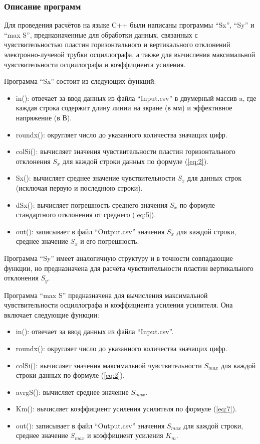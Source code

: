 \subsubsection{Описание программ}

Для проведения расчётов на языке C++ были написаны программы ``Sx'', ``Sy'' и ``max S'', предназначенные для обработки данных, связанных с чувствительностью пластин горизонтального и вертикального отклонений электронно-лучевой трубки осциллографа, а также для вычисления максимальной чувствительности осциллографа и коэффициента усиления.

Программа ``Sx'' состоит из следующих функций:
\begin{itemize}
\item in(): отвечает за ввод данных из файла ``Input.csv'' в двумерный массив a, где каждая строка содержит длину линии на экране (в мм) и эффективное напряжение (в В).
\item roundx(): округляет число до указанного количества значащих цифр.
\item colSi(): вычисляет значения чувствительности пластин горизонтального отклонения $S_x$ для каждой строки данных по формуле (\ref{eq:2}).
\item Sx(): вычисляет среднее значение чувствительности $S_x$ для данных строк (исключая первую и последнюю строки).
\item dSx(): вычисляет погрешность среднего значения $S_x$ по формуле стандартного отклонения от среднего (\ref{eq:5}).
\item out(): записывает в файл ``Output.csv'' значения $S_x$ для каждой строки, среднее значение $S_x$ и его погрешность.
\end{itemize}

Программа ``Sy'' имеет аналогичную структуру и в точности совпадающие функции, но предназначена для расчёта чувствительности пластин вертикального отклонения $S_y$.

Программа ``max S'' предназначена для вычисления максимальной чувствительности осциллографа и коэффициента усиления усилителя. Она включает следующие функции:

\begin{itemize}
\item in(): отвечает за ввод данных из файла ``Input.csv''.
\item roundx(): округляет число до указанного количества значащих цифр.
\item colSi(): вычисляет значения максимальной чувствительности $S_{max}$ для каждой строки данных по формуле (\ref{eq:2}).
\item avrgS(): вычисляет среднее значение $S_{max}$.
\item Km(): вычисляет коэффициент усиления усилителя по формуле (\ref{eq:7}).
\item out(): записывает в файл ``Output.csv'' значения $S_{max}$ для каждой строки, среднее значение $S_{max}$ и коэффициент усиления $K_m$.
\end{itemize}

